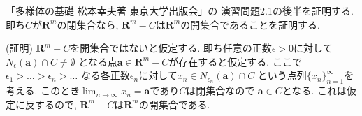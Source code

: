 \documentclass{jlreq}
\begin{document}
「多様体の基礎 松本幸夫著 東京大学出版会」の
演習問題2.1の後半を証明する.
即ち$C$が$\bm{R}^{m}$の閉集合なら,
$\bm{R}^{m}-C$は$\bm{R}^{m}$の開集合であることを証明する.

(証明)
$\bm{R}^{m}-C$を開集合ではないと仮定する.
即ち任意の正数$\epsilon > 0$に対して
$N_{\epsilon}(\bm{a}) \cap C \neq \emptyset$
となる点$\bm{a} \in \bm{R}^{m}-C$が存在すると仮定する.
ここで$\epsilon_{1} > \dots > \epsilon_{n} > \dots $
なる各正数$\epsilon_{n}$に対して$x_{n} \in N_{\epsilon_{n}}(\bm{a}) \cap C$
という点列$\{x_{n}\}^{\infty}_{n=1}$を考える.
このとき$\displaystyle \lim_{n \to \infty} x_{n} = \bm{a}$であり$C$は閉集合なので
$\bm{a} \in C$となる.
これは仮定に反するので, $\bm{R}^{m}-C$は$\bm{R}^{m}$の開集合である.
\end{document}
